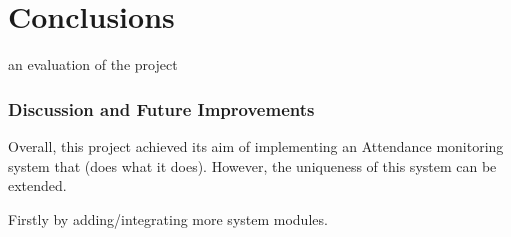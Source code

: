 \chapter{Conclusions}
an evaluation of the project

\subsection{Discussion and Future Improvements}

Overall, this project achieved its aim of implementing an Attendance monitoring system that (does what it does). However, the uniqueness of this system can be extended.

Firstly by adding/integrating more system modules.